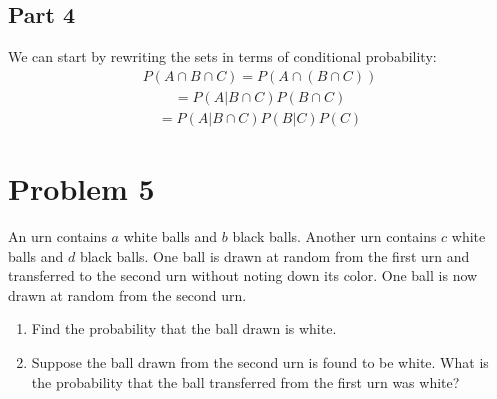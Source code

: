 \documentclass{article}
\begin{document}
\subsection*{Part 4}
We can start by rewriting the sets in terms of conditional probability:
\begin{align*}
P(A\cap B\cap C) =  P(A\cap (B \cap C))
\end{align*}
\begin{align*}
= P(A|B\cap C) P(B\cap C)
\end{align*}
\begin{align*}
\boxed{= P(A|B\cap C) P(B|C)P(C)}
\end{align*}
\clearpage

\section*{Problem 5}
An urn contains $a$ white balls and $b$ black balls. Another urn contains $c$ white balls and $d$ black balls. One ball is drawn at random from the first urn and transferred to the second urn without noting down its color. One ball is now drawn at random from the second urn.

\begin{enumerate}
    \item
    Find the probability that the ball drawn is white.
    \item
    Suppose the ball drawn from the second urn is found to be white. What is the probability that the ball transferred from the first urn was white?
    \end{enumerate}
\end{document}
